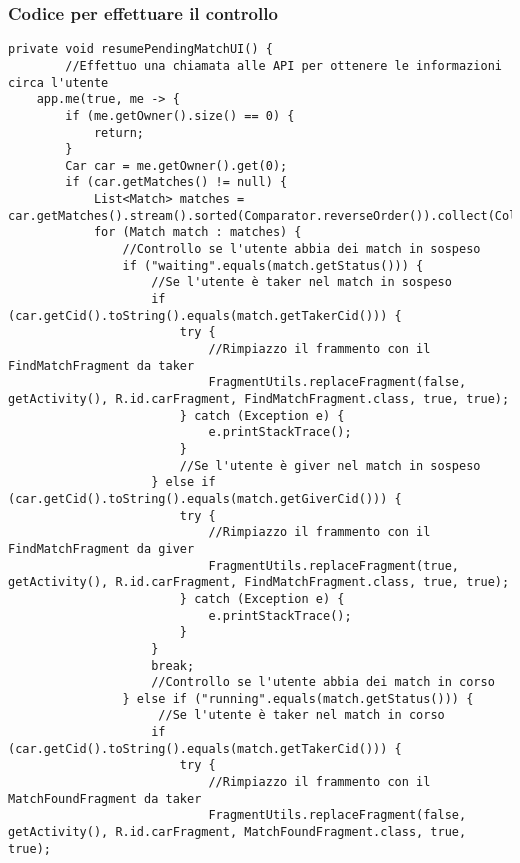 \hypertarget{codice-per-effettuare-il-controllo}{%
\subsubsection{Codice per effettuare il
controllo}\label{codice-per-effettuare-il-controllo}}

\begin{lstlisting}
private void resumePendingMatchUI() {
		//Effettuo una chiamata alle API per ottenere le informazioni circa l'utente
    app.me(true, me -> {
        if (me.getOwner().size() == 0) {
            return;
        }
        Car car = me.getOwner().get(0);
        if (car.getMatches() != null) {
            List<Match> matches = car.getMatches().stream().sorted(Comparator.reverseOrder()).collect(Collectors.toList());
            for (Match match : matches) {
                //Controllo se l'utente abbia dei match in sospeso
                if ("waiting".equals(match.getStatus())) {
                    //Se l'utente è taker nel match in sospeso
                    if (car.getCid().toString().equals(match.getTakerCid())) {
                        try {
                            //Rimpiazzo il frammento con il FindMatchFragment da taker
                            FragmentUtils.replaceFragment(false, getActivity(), R.id.carFragment, FindMatchFragment.class, true, true);
                        } catch (Exception e) {
                            e.printStackTrace();
                        }
                        //Se l'utente è giver nel match in sospeso
                    } else if (car.getCid().toString().equals(match.getGiverCid())) {
                        try {
                            //Rimpiazzo il frammento con il FindMatchFragment da giver
                            FragmentUtils.replaceFragment(true, getActivity(), R.id.carFragment, FindMatchFragment.class, true, true);
                        } catch (Exception e) {
                            e.printStackTrace();
                        }
                    }
                    break;
                    //Controllo se l'utente abbia dei match in corso
                } else if ("running".equals(match.getStatus())) {
                     //Se l'utente è taker nel match in corso
                    if (car.getCid().toString().equals(match.getTakerCid())) {
                        try {
                            //Rimpiazzo il frammento con il  MatchFoundFragment da taker
                            FragmentUtils.replaceFragment(false, getActivity(), R.id.carFragment, MatchFoundFragment.class, true, true);

\end{lstlisting}
